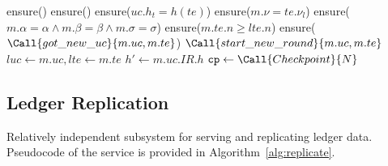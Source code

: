 \begin{algorithm}[tb]
  \caption{Processing a received Block Proposal}\label{alg:ver-proposal}
  \begin{algorithmic}[0]
      \State ensure()    
      \State ensure()
      \State ensure($uc.h_t = h(te)$)
      \State ensure($m.\nu = te.\nu_l$)  
      \State ensure($m.\alpha = \alpha \land m.\beta = \beta \land m.\sigma = \sigma$)
      \State ensure($m.te.n \ge lte.n$)
        \State {}  
        \State \Return
      \EndIf
         \State ensure($\Call{got\_new\_uc}{m.uc, m.te}$)  
           \State \Return $\Call{start\_new\_round}{m.uc, m.te}$
         \Else
           \State $luc \gets m.uc, lte \gets m.te$
         \EndIf
      \EndIf
      \State $h' \gets m.uc.IR.h$
        \State $\mathtt{cp} \gets \Call{Checkpoint}{N}$
        \State {}
          \State {}
        \EndFor
        \State {}
        \State {}  
      \Else
        \State {}  
      \EndIf
    \EndMessage
  \end{algorithmic}
\end{algorithm}

\subsection{Ledger Replication}\label{ledger-replication}

Relatively independent subsystem for serving and replicating ledger
data. Pseudocode of the service is provided in Algorithm~\ref{alg:replicate}.

\begin{algorithm}
  \caption{Ledger Replication}\label{alg:replicate}
  \begin{algorithmic}[0]
      \State {}
      \State {}
    \EndMessage
  \end{algorithmic}
\end{algorithm}

